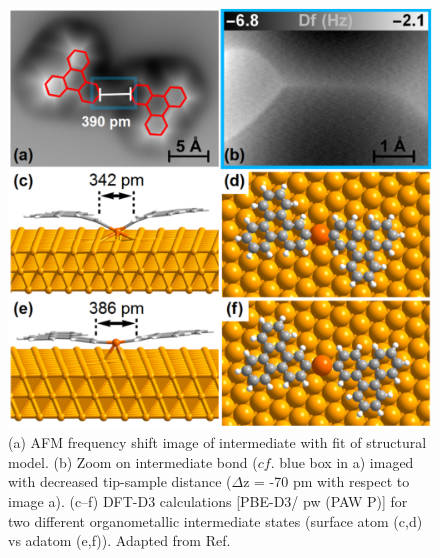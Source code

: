 \documentclass[%
 reprint,
 amsmath,amssymb,
 aps,
prb,
floatfix,
]{revtex4-2}
\begin{document}
\begin{figure}[bt]
\centering
\includegraphics[width=0.75\columnwidth]{Fig/distance.png}
\caption{(a) AFM frequency shift image of intermediate with fit of structural model. (b) Zoom on intermediate bond ($cf$. blue box in a) imaged with decreased tip-sample distance ($\Delta$z = -70 pm with respect to image a). (c--f) DFT-D3 calculations [PBE-D3/ pw (PAW P)] for two different organometallic intermediate states (surface atom (c,d) vs adatom (e,f)). Adapted from Ref.~\cite{acsnano2017}}
\label{fig:adatom-CMC-evidence1}
\end{figure}

\end{document}
